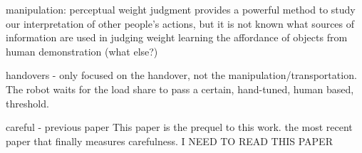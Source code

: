 manipulation:
\cite{hamilton_kinematic_2007} perceptual weight judgment provides a powerful method to study our interpretation of other people's actions, but it is not known what sources of information are used in judging weight
\cite{kjellstrom_visual_2010} learning the affordance of objects from human demonstration (what else?)

handovers - 
\cite{Medina2016} only focused on the handover, not the manipulation/transportation. The robot waits for the load share to pass a certain, hand-tuned, human based, threshold.

careful - 
previous paper \cite{duarte_human_2020} This paper is the prequel to this work.
\cite{lastrico_careful_2021} the most recent paper that finally measures carefulness. I NEED TO READ THIS PAPER
 

